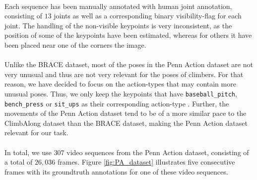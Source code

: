 \documentclass[./main.tex]{subfiles}
\begin{document}
\\
Each sequence has been manually annotated with human joint annotation, consisting of $13$ joints as well as a corresponding binary visibility-flag for each joint. The handling of the non-visible keypoints is very inconsistent, as the position of some of the keypoints have been estimated, whereas for others it have been placed near one of the corners the image.
\\
\\
Unlike the BRACE dataset, most of the poses in the Penn Action dataset are not very unusual and thus are not very relevant for the poses of climbers. For that reason, we have decided to focus on the action-types that may contain more unusual poses. Thus, we only keep the keypoints that have \texttt{baseball\_pitch}, \texttt{bench\_press} or \texttt{sit\_ups} as their corresponding action-type \cite{penn_action}. Further, the movements of the Penn Action dataset tend to be of a more similar pace to the ClimbAlong dataset than the BRACE dataset, making the Penn Action dataset relevant for our task.
\\
\\
In total, we use $307$ video sequences from the Penn Action dataset, consisting of a total of $26,036$ frames. Figure \ref{fig:PA_dataset} illustrates five consecutive frames with its groundtruth annotations for one of these video sequences.
\end{document}
